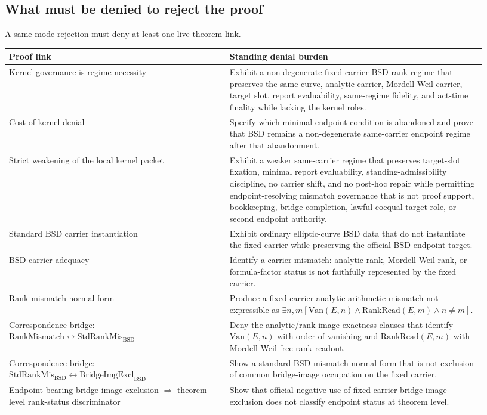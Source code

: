 \documentclass[11pt]{article}
\newcommand{\BSD}{\mathrm{BSD}}
\newcommand{\Van}{\mathrm{Van}}
\newcommand{\RankRead}{\mathrm{RankRead}}
\newcommand{\RankMismatch}{\mathrm{RankMismatch}}
\newcommand{\StdRankMis}{\mathrm{StdRankMis}_{\BSD}}
\newcommand{\BridgeImgExcl}{\mathrm{BridgeImgExcl}_{\BSD}}
\begin{document}
\subsection*{What must be denied to reject the proof}
A same-mode rejection must deny at least one live theorem link.
\begin{longtable}{L{0.43\linewidth}L{0.50\linewidth}}
\toprule
\textbf{Proof link} & \textbf{Standing denial burden}\\
\midrule
Kernel governance is regime necessity & Exhibit a non-degenerate fixed-carrier BSD rank regime that preserves the same curve, analytic carrier, Mordell-Weil carrier, target slot, report evaluability, same-regime fidelity, and act-time finality while lacking the kernel roles.\\
Cost of kernel denial & Specify which minimal endpoint condition is abandoned and prove that BSD remains a non-degenerate same-carrier endpoint regime after that abandonment.\\
Strict weakening of the local kernel packet & Exhibit a weaker same-carrier regime that preserves target-slot fixation, minimal report evaluability, standing-admissibility discipline, no carrier shift, and no post-hoc repair while permitting endpoint-resolving mismatch governance that is not proof support, bookkeeping, bridge completion, lawful coequal target role, or second endpoint authority.\\
Standard BSD carrier instantiation & Exhibit ordinary elliptic-curve BSD data that do not instantiate the fixed carrier while preserving the official BSD endpoint target.\\
BSD carrier adequacy & Identify a carrier mismatch: analytic rank, Mordell-Weil rank, or formula-factor status is not faithfully represented by the fixed carrier.\\
Rank mismatch normal form & Produce a fixed-carrier analytic-arithmetic mismatch not expressible as $\exists n,m[\Van(E,n)\wedge\RankRead(E,m)\wedge n\neq m]$.\\
Correspondence bridge: $\RankMismatch\leftrightarrow\StdRankMis$ & Deny the analytic/rank image-exactness clauses that identify $\Van(E,n)$ with order of vanishing and $\RankRead(E,m)$ with Mordell-Weil free-rank readout.\\
Correspondence bridge: $\StdRankMis\leftrightarrow\BridgeImgExcl$ & Show a standard BSD mismatch normal form that is not exclusion of common bridge-image occupation on the fixed carrier.\\
Endpoint-bearing bridge-image exclusion $\Rightarrow$ theorem-level rank-status discriminator & Show that official negative use of fixed-carrier bridge-image exclusion does not classify endpoint status at theorem level.\\

\end{longtable}
\end{document}
